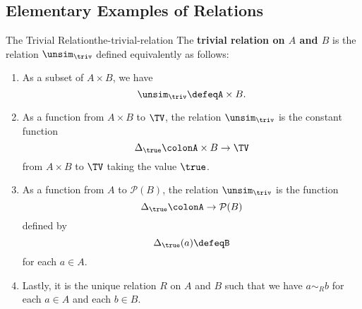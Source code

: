 \subsection{Elementary Examples of Relations}\label{subsection-elementary-examples-of-relations}
\begin{example}{The Trivial Relation}{the-trivial-relation}%
    The \textbf{trivial relation on $A$ and $B$} is the relation $\unsim_{\triv}$ defined equivalently as follows:
    \begin{enumerate}
        \item\label{the-trivial-relation-1}As a subset of $A\times B$, we have
            \[
                \unsim_{\triv}%
                \defeq%
                A\times B.%
            \]%
        \item\label{the-trivial-relation-2}As a function from $A\times B$ to $\TV$, the relation $\unsim_{\triv}$ is the constant function
            \[%
                \Delta_{\true}%
                \colon%
                A\times B%
                \to%
                \TV%
            \]%
            from $A\times B$ to $\TV$ taking the value $\true$.
        \item\label{the-trivial-relation-3}As a function from $A$ to $\mathcal{P}(B)$, the relation $\unsim_{\triv}$ is the function
            \[%
                \Delta_{\true}%
                \colon%
                A%
                \to%
                \mathcal{P}(B)%
            \]%
            defined by
            \[
                \Delta_{\true}(a)%
                \defeq%
                B%
            \]%
            for each $a\in A$.
        \item\label{the-trivial-relation-4}Lastly, it is the unique relation $R$ on $A$ and $B$ such that we have $a\sim_{R}b$ for each $a\in A$ and each $b\in B$.
    \end{enumerate}
\end{example}
